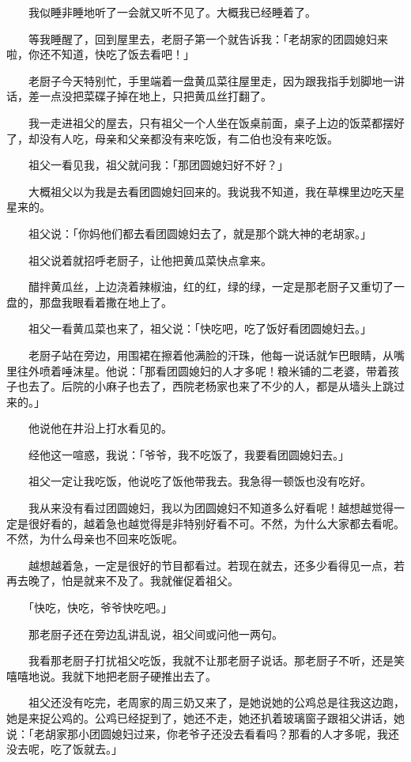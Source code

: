 \documentclass[UTF8]{ctexart}
\begin{document}
　　我似睡非睡地听了一会就又听不见了。大概我已经睡着了。

　　等我睡醒了，回到屋里去，老厨子第一个就告诉我：「老胡家的团圆媳妇来啦，你还不知道，快吃了饭去看吧！」

　　老厨子今天特别忙，手里端着一盘黄瓜菜往屋里走，因为跟我指手划脚地一讲话，差一点没把菜碟子掉在地上，只把黄瓜丝打翻了。

　　我一走进祖父的屋去，只有祖父一个人坐在饭桌前面，桌子上边的饭菜都摆好了，却没有人吃，母亲和父亲都没有来吃饭，有二伯也没有来吃饭。

　　祖父一看见我，祖父就问我：「那团圆媳妇好不好？」

　　大概祖父以为我是去看团圆媳妇回来的。我说我不知道，我在草棵里边吃天星星来的。

　　祖父说：「你妈他们都去看团圆媳妇去了，就是那个跳大神的老胡家。」

　　祖父说着就招呼老厨子，让他把黄瓜菜快点拿来。

　　醋拌黄瓜丝，上边浇着辣椒油，红的红，绿的绿，一定是那老厨子又重切了一盘的，那盘我眼看着撒在地上了。

　　祖父一看黄瓜菜也来了，祖父说：「快吃吧，吃了饭好看团圆媳妇去。」

　　老厨子站在旁边，用围裙在擦着他满脸的汗珠，他每一说话就乍巴眼睛，从嘴里往外喷着唾沫星。他说：「那看团圆媳妇的人才多呢！粮米铺的二老婆，带着孩子也去了。后院的小麻子也去了，西院老杨家也来了不少的人，都是从墙头上跳过来的。」

　　他说他在井沿上打水看见的。

　　经他这一喧惑，我说：「爷爷，我不吃饭了，我要看团圆媳妇去。」

　　祖父一定让我吃饭，他说吃了饭他带我去。我急得一顿饭也没有吃好。

　　我从来没有看过团圆媳妇，我以为团圆媳妇不知道多么好看呢！越想越觉得一定是很好看的，越着急也越觉得是非特别好看不可。不然，为什么大家都去看呢。不然，为什么母亲也不回来吃饭呢。

　　越想越着急，一定是很好的节目都看过。若现在就去，还多少看得见一点，若再去晚了，怕是就来不及了。我就催促着祖父。

　　「快吃，快吃，爷爷快吃吧。」

　　那老厨子还在旁边乱讲乱说，祖父间或问他一两句。

　　我看那老厨子打扰祖父吃饭，我就不让那老厨子说话。那老厨子不听，还是笑嘻嘻地说。我就下地把老厨子硬推出去了。

　　祖父还没有吃完，老周家的周三奶又来了，是她说她的公鸡总是往我这边跑，她是来捉公鸡的。公鸡已经捉到了，她还不走，她还扒着玻璃窗子跟祖父讲话，她说：「老胡家那小团圆媳妇过来，你老爷子还没去看看吗？那看的人才多呢，我还没去呢，吃了饭就去。」
\end{document}
